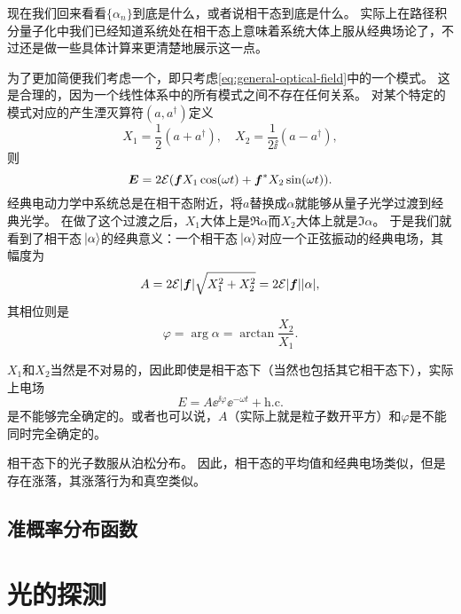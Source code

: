 现在我们回来看看$\{\alpha_n\}$到底是什么，或者说相干态到底是什么。
实际上在路径积分量子化中我们已经知道系统处在相干态上意味着系统大体上服从经典场论了，不过还是做一些具体计算来更清楚地展示这一点。

为了更加简便我们考虑一个，即只考虑\eqref{eq:general-optical-field}中的一个模式。
这是合理的，因为一个线性体系中的所有模式之间不存在任何关系。
对某个特定的模式对应的产生湮灭算符$(a, a^\dagger)$定义
\begin{equation}
    X_1 = \frac{1}{2} (a + a^\dagger), \quad X_2 = \frac{1}{2\ii} (a - a^\dagger),
\end{equation}
则
\begin{equation}
    \vb*{E} = 2 \mathcal{E} (\vb*{f} X_1 \cos(\omega t) + \vb*{f}^* X_2 \sin(\omega t)).
\end{equation}
经典电动力学中系统总是在相干态附近，将$a$替换成$\alpha$就能够从量子光学过渡到经典光学。
在做了这个过渡之后，$X_1$大体上是$\Re{\alpha}$而$X_2$大体上就是$\Im{\alpha}$。
于是我们就看到了相干态$\ket*{\alpha}$的经典意义：一个相干态$\ket*{\alpha}$对应一个正弦振动的经典电场，其幅度为
\begin{equation}
    A = 2 \mathcal{E} \abs{\vb*{f}} \sqrt{X_1^2 + X_2^2} = 2 \mathcal{E} \abs{\vb*{f}} \abs{\alpha},
\end{equation}
其相位则是
\begin{equation}
    \varphi = \arg \alpha = \arctan \frac{X_2}{X_1}.
\end{equation}

$X_1$和$X_2$当然是不对易的，因此即使是相干态下（当然也包括其它相干态下），实际上电场
\begin{equation}
    E = A \ee^{\ii \varphi} \ee^{- \omega t} + \text{h.c.}
\end{equation}
是不能够完全确定的。或者也可以说，$A$（实际上就是粒子数开平方）和$\varphi$是不能同时完全确定的。

相干态下的光子数服从泊松分布。
因此，相干态的平均值和经典电场类似，但是存在涨落，其涨落行为和真空类似。

\subsection{准概率分布函数}



\section{光的探测}

